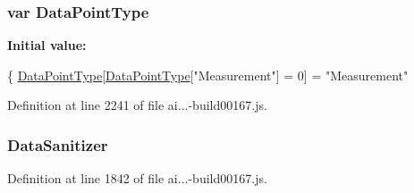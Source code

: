 \subsubsection[{\texorpdfstring{Data\+Point\+Type}{DataPointType}}]{\setlength{\rightskip}{0pt plus 5cm}var Data\+Point\+Type}\hypertarget{_scripts_2ai_80_822_89-build00167_8js_aa093c6c94aa5d7f88d2106cf69c9d985}{}\label{_scripts_2ai_80_822_89-build00167_8js_aa093c6c94aa5d7f88d2106cf69c9d985}
{\bfseries Initial value\+:}
\begin{DoxyCode}
\{
        \hyperlink{obj_2_release_2_package_2_package_tmp_2_scripts_2ai_80_822_89-build00167_8js_aa093c6c94aa5d7f88d2106cf69c9d985}{DataPointType}[\hyperlink{obj_2_release_2_package_2_package_tmp_2_scripts_2ai_80_822_89-build00167_8js_aa093c6c94aa5d7f88d2106cf69c9d985}{DataPointType}[\textcolor{stringliteral}{"Measurement"}] = 0] = \textcolor{stringliteral}{"Measurement"}
\end{DoxyCode}


Definition at line 2241 of file ai...-\/build00167.\+js.

\subsubsection[{\texorpdfstring{Data\+Sanitizer}{DataSanitizer}}]{ Data\+Sanitizer}\hypertarget{_scripts_2ai_80_822_89-build00167_8js_ac96aeb56be9881f7bbe42dc6a9ab57fe}{}\label{_scripts_2ai_80_822_89-build00167_8js_ac96aeb56be9881f7bbe42dc6a9ab57fe}


Definition at line 1842 of file ai...-\/build00167.\+js.

